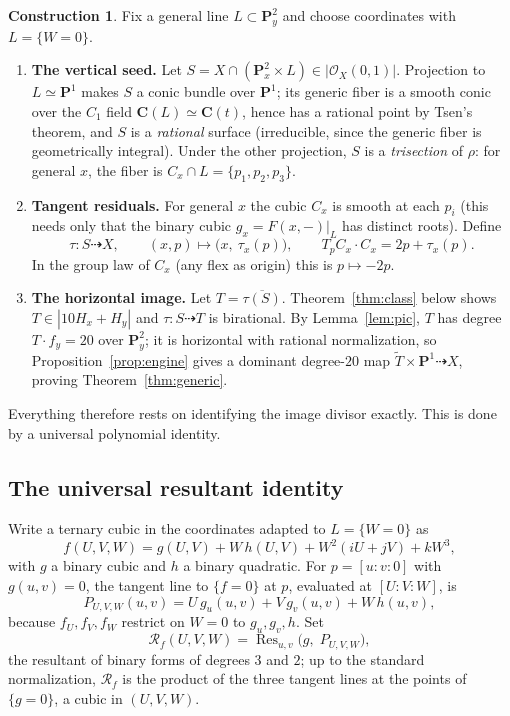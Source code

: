 \documentclass[11pt]{amsart}
\theoremstyle{definition}
\newtheorem{construction}[theorem]{Construction}
\theoremstyle{remark}
\newcommand{\PP}{\mathbf{P}}
\newcommand{\CC}{\mathbf{C}}
\newcommand{\Res}{\operatorname{Res}}
\newcommand{\Hx}{H_x}
\newcommand{\Hy}{H_y}
\newcommand{\calR}{\mathcal{R}}
\begin{document}
\begin{construction}\label{con:map}
Fix a general line $L\subset\PP^2_y$ and choose coordinates with
$L=\{W=0\}$.
\begin{enumerate}
\item[\textbf{(I)}] \textbf{The vertical seed.}  Let
$S=X\cap(\PP^2_x\times L)\in|\mathcal O_X(0,1)|$.  Projection to
$L\simeq\PP^1$ makes $S$ a conic bundle over $\PP^1$; its generic fiber is
a smooth conic over the $C_1$ field $\CC(L)\simeq\CC(t)$, hence has a
rational point by Tsen's theorem, and $S$ is a \emph{rational} surface
(irreducible, since the generic fiber is geometrically integral).  Under
the other projection, $S$ is a \emph{trisection} of $\rho$: for general
$x$, the fiber is $C_x\cap L=\{p_1,p_2,p_3\}$.
\item[\textbf{(II)}] \textbf{Tangent residuals.}  For general $x$ the
cubic $C_x$ is smooth at each $p_i$ (this needs only that the binary cubic
$g_x=F(x,-)|_L$ has distinct roots).  Define
\[
\tau\colon S\dashrightarrow X,\qquad
(x,p)\longmapsto\bigl(x,\ \tau_x(p)\bigr),\qquad
T_pC_x\cdot C_x=2p+\tau_x(p).
\]
In the group law of $C_x$ (any flex as origin) this is $p\mapsto -2p$.
\item[\textbf{(III)}] \textbf{The horizontal image.}  Let
$T=\overline{\tau(S)}$.  Theorem~\ref{thm:class} below shows
$T\in|10\Hx+\Hy|$ and $\tau\colon S\dashrightarrow T$ is birational.  By
Lemma~\ref{lem:pic}, $T$ has degree $T\cdot f_y=20$ over $\PP^2_y$; it is
horizontal with rational normalization, so Proposition~\ref{prop:engine}
gives a dominant degree-$20$ map
$\widetilde T\times\PP^1\dashrightarrow X$, proving
Theorem~\ref{thm:generic}.
\end{enumerate}
\end{construction}

Everything therefore rests on identifying the image divisor exactly.  This
is done by a universal polynomial identity.

\subsection{The universal resultant identity}

Write a ternary cubic in the coordinates adapted to $L=\{W=0\}$ as
\begin{equation}\label{eq:f}
f(U,V,W)=g(U,V)+W\,h(U,V)+W^2(iU+jV)+kW^3,
\end{equation}
with $g$ a binary cubic and $h$ a binary quadratic.  For
$p=[u{:}v{:}0]$ with $g(u,v)=0$, the tangent line to $\{f=0\}$ at $p$,
evaluated at $[U{:}V{:}W]$, is
\[
P_{U,V,W}(u,v)=U\,g_u(u,v)+V\,g_v(u,v)+W\,h(u,v),
\]
because $f_U,f_V,f_W$ restrict on $W=0$ to $g_u,g_v,h$.  Set
\[
\calR_f(U,V,W)=\Res_{u,v}\bigl(g,\;P_{U,V,W}\bigr),
\]
the resultant of binary forms of degrees $3$ and $2$; up to the standard
normalization, $\calR_f$ is the product of the three tangent lines at the
points of $\{g=0\}$, a cubic in $(U,V,W)$.
\end{document}
